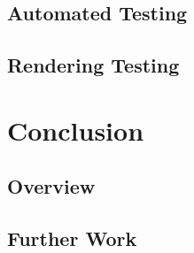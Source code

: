 \documentclass[nobib, a4paper, twoside, justified]{tufte-book}
\begin{document}
\section{Automated Testing}%
\label{sec:automated_testing}

\section{Rendering Testing}%
\label{sec:rendering_testing}

\chapter{Conclusion}%
\label{cha:conclusion}

\section{Overview}%
\label{sec:overview}

\section{Further Work}%
\label{sec:further_work}



\backmatter%

\printbibliography[heading=bibintoc]

\printglossary%
\label{glossary}


\end{document}
